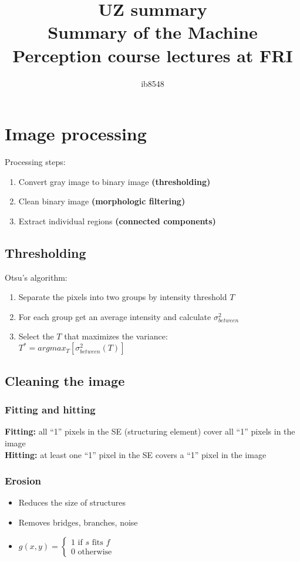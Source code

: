 \documentclass{article}
\author{ib8548}
\title{
    UZ summary \\
    \large Summary of the Machine Perception course lectures at FRI
}
\begin{document}
\maketitle
\newpage
\tableofcontents
\newpage

\section{Image processing}

Processing steps:
\begin{enumerate}
    \item Convert gray image to binary image \textbf{(thresholding)}
    \item Clean binary image \textbf{(morphologic filtering)}
    \item Extract individual regions \textbf{(connected components)}
\end{enumerate}

    \subsection{Thresholding}
    Otsu's algorithm:
    \begin{enumerate}
        \item Separate the pixels into two groups by intensity threshold $T$
        \item For each group get an average intensity and calculate $\sigma^{2}_{between}$
        \item Select the $T$ that maximizes the variance: \\
                  $T^* = argmax_T[ \sigma^{2}_{between}(T) ]$
    \end{enumerate}

    \subsection{Cleaning the image}
    
        \subsubsection{Fitting and hitting}
        \textbf{Fitting:} all ``1'' pixels in the SE (structuring element) cover all ``1'' pixels in the image \\ 
        \textbf{Hitting:} at least one ``1'' pixel in the SE covers a ``1'' pixel in the image

        \subsubsection{Erosion}
        \begin{itemize}
            \item Reduces the size of structures
            \item Removes bridges, branches, noise
            \item $g(x, y) = 
            \begin{cases}
                1 \text{ if } s \text{ fits } f \\
                0 \text{ otherwise }
            \end{cases}$
        \end{itemize}
\end{document}
